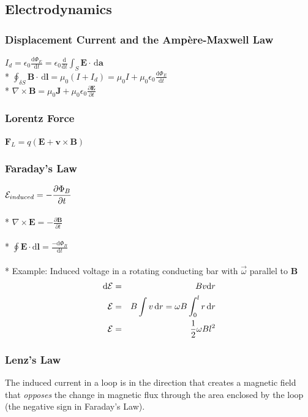 \subsection{Electrodynamics}

\subsubsection{Displacement Current and the Amp\`ere-Maxwell Law}
\(\displaystyle I_d=\epsilon_0\frac{\mathrm{d}\Phi_E}{\mathrm{d}t}=\epsilon_0\frac{\mathrm{d}}{\mathrm{d}t}\int_S\mathbf{E}\cdot\,\mathrm{d}\mathbf{a}\)\\*
\(\displaystyle\oint_{\delta S}\mathbf{B}\cdot\,\mathrm{d}\mathbf{l}=\mu_0 (I+I_d)=\mu_0I +\mu_0\epsilon_0\frac{\mathrm{d}\Phi_E}{\mathrm{d}t}\)\\*
\(\displaystyle\nabla\times\mathbf{B}=\mu_0\mathbf{J}+\mu_0\epsilon_0\frac{\partial\mathbf{E}}{\partial t}\)

\subsubsection{Lorentz Force}
\(\mathbf{F}_L=q(\mathbf{E}+\mathbf{v}\times\mathbf{B})\)

\subsubsection{Faraday's Law}
\(\displaystyle{\cal{E}}_{induced}=-\frac{\partial\Phi_B}{\partial t}\)\\\\*
\(\displaystyle\nabla\times\mathbf{E}=-\frac{\partial\mathbf{B}}{\partial t}\)\\\\*
\(\displaystyle\oint\mathbf{E}\cdot\mathrm{d}\mathbf{l}=\frac{-\mathrm{d}\Phi_B}{\mathrm{d}t}\)\\\\*
Example: Induced voltage in a rotating conducting bar with \(\vec{\omega}\) parallel to \(\mathbf{B}\)
\begin{eqnarray}
\mathrm{d}{\cal E}&=&Bv\mathrm{d}r \nonumber\\
{\cal E}&=&B\int v\,\mathrm{d}r=\omega B\int_0^l r\,\mathrm{d}r \nonumber\\
{\cal E}&=&\frac{1}{2}\omega Bl^2 \nonumber
\end{eqnarray}

\subsubsection{Lenz's Law}
The induced current in a loop is in the direction that creates a magnetic field that \emph{opposes} the change in magnetic flux through the area enclosed by the loop (the negative sign in Faraday's Law).

